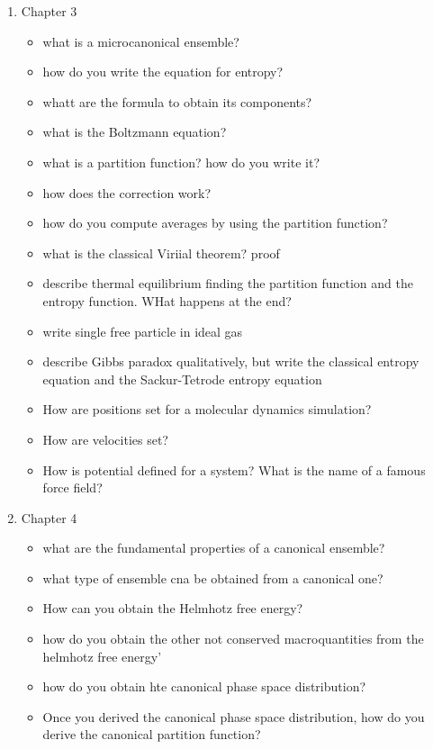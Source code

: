 \begin{enumerate}
\begin{itemize}
    \end{itemize}
    \item Chapter 3
    \begin{itemize}
        \item what is a microcanonical ensemble?
        \item how do you write the equation for entropy?
        \item whatt are the formula to obtain its components?
        \item what is the Boltzmann equation?
        \item what is a partition function? how do you write it?
        \item how does the correction work?
        \item how do you compute averages by using the partition function?
        \item what is the classical Viriial theorem? proof
        \item describe thermal equilibrium finding the partition function and the entropy function. WHat happens at the end?
        \item write single free particle in ideal gas
        \item describe Gibbs paradox qualitatively, but write the classical entropy equation and the Sackur-Tetrode entropy equation
        \item How are positions set for a molecular dynamics simulation?
        \item How are velocities set?
        \item How is potential defined for a system? What is the name of a famous force field?
    \end{itemize}
    \item Chapter 4
    \begin{itemize}
        \item what are the fundamental properties of a canonical ensemble?
        \item what type of ensemble cna be obtained from a canonical one?
        \item How can you obtain the Helmhotz free energy? 
        \item how do you obtain the other not conserved macroquantities from the helmhotz free energy'
        \item how do you obtain hte canonical phase space distribution?
        \item Once you derived the canonical phase space distribution, how do you derive the canonical partition function?

\end{itemize}
\end{enumerate}
